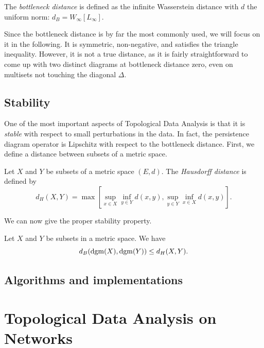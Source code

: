 \documentclass[a4paper,11pt,openany,extrafontsizes]{memoir}
\begin{document}
\begin{defn}
  The \emph{bottleneck distance} is defined as the infinite
  Wasserstein distance with $d$ the uniform norm:
  $d_B = W_\infty[L_\infty]$.
\end{defn}

Since the bottleneck distance is by far the most commonly used, we
will focus on it in the following. It is symmetric, non-negative, and
satisfies the triangle inequality. However, it is not a true distance,
as it is fairly straightforward to come up with two distinct diagrams
at bottleneck distance zero, even on multisets not touching the
diagonal $\Delta$.

\section{Stability}%
\label{sec:stability}

One of the most important aspects of Topological Data Analysis is that
it is \emph{stable} with respect to small perturbations in the
data. In fact, the persistence diagram operator is Lipschitz with
respect to the bottleneck distance. First, we define a distance
between subsets of a metric space.

\begin{defn}
  Let $X$ and $Y$ be subsets of a metric space $(E, d)$. The
  \emph{Hausdorff distance} is defined by
  \[ d_H(X,Y) = \max \left[ \sup_{x\in X} \inf_{y\in Y} d(x,y),
      \sup_{y\in Y} \inf_{x\in X} d(x,y) \right]. \]
\end{defn}

We can now give the proper stability property.

\begin{prop}
  Let $X$ and $Y$ be subsets in a metric space. We have
  \[ d_B(\operatorname{dgm}(X),\operatorname{dgm}(Y)) \leq d_H(X,Y). \]
\end{prop}

\section{Algorithms and implementations}%
\label{sec:algor-impl}

\cite{morozov_dionysus:_2018,bauer_ripser:_2018,reininghaus_dipha_2018,maria_gudhi_2014}

\chapter{Topological Data Analysis on Networks}%
\label{cha:topol-data-analys}
\end{document}
